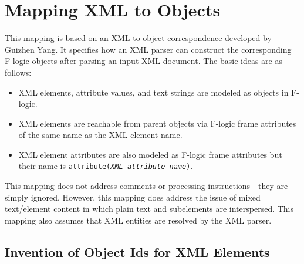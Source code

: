

\section{Mapping XML to \FLSYSTEM Objects}\label{xml-to-flora}

This mapping is based on an XML-to-\FLORA object correspondence developed
by Guizhen Yang.
It specifies how an XML parser can construct the
corresponding F-logic objects after parsing an input XML document.
The basic ideas are as follows:
\begin{itemize}
\item XML elements, attribute values,
  and text strings are modeled as objects in F-logic.

\item XML elements are reachable from parent objects
  via F-logic frame attributes of the same
  name as the XML element name.

\item XML element attributes are also modeled as F-logic  frame attributes
    but their name is
    \texttt{attribute(\textnormal{\emph{XML attribute name}})}.
\end{itemize}

This mapping does not address 
comments or processing instructions---they are simply ignored.
However, this mapping does address the issue of mixed
text/element content in which plain text and subelements are interspersed.
This mapping also assumes that XML entities are
resolved by the XML parser.



\subsection{Invention of Object Ids for XML Elements}

